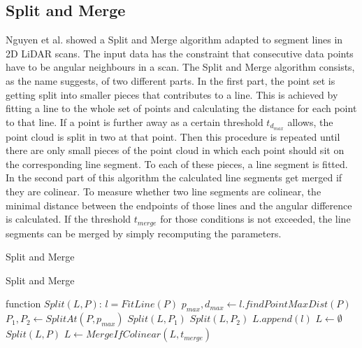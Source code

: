 \documentclass{scp}
\begin{document}
\subsection*{Split and Merge} \label{sec:SNM}
Nguyen et al. showed a Split and Merge algorithm adapted to segment lines in 2D LiDAR scans. The input data has the constraint that consecutive data points have to be angular neighbours in a scan. The Split and Merge algorithm consists, as the name suggests, of two different parts. In the first part, the point set is getting split into smaller pieces that contributes to a line. This is achieved by fitting a line to the whole set of points and calculating the distance for each point to that line. If a point is further away as a certain threshold $t_{d_{max}}$ allows, the point cloud is split in two at that point. Then this procedure is repeated until there are only small pieces of the point cloud in which each point should sit on the corresponding line segment. To each of these pieces, a line segment is fitted. \\
In the second part of this algorithm the calculated line segments get merged if they are colinear. To measure whether two line segments are colinear, the minimal distance between the endpoints of those lines and the angular difference is calculated. If the threshold $t_{merge}$ for those conditions is not exceeded, the line segments can be merged by simply recomputing the parameters. 


\begin{algorithm}[h]
\caption{Split and Merge}\label{Split}
\begin{algorithmic}[1]
\caption{Split and Merge}
\State function $Split(L,P)$:
    \State $l = FitLine(P)$
    \State $p_{max}, d_{max} \leftarrow l.findPointMaxDist(P)$
        \State $P_1, P_2 \leftarrow SplitAt(P,p_{max})$
        \State $Split(L,P_1)$
        \State $Split(L,P_2)$
    \Else
        \State $L.append(l)$
    \EndIf
\State
\State $L \leftarrow \emptyset$
\State $Split(L,P)$
\State $L \leftarrow MergeIfColinear(L, t_{merge})$
\end{algorithmic}
\end{algorithm}
\end{document}
